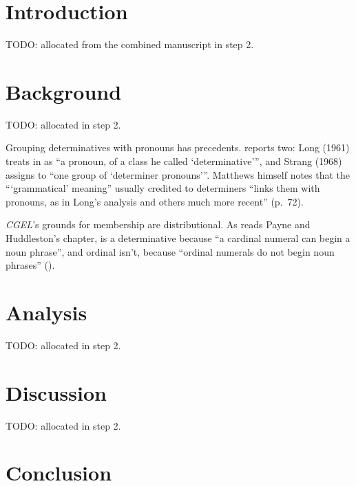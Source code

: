 \documentclass[12pt]{article}
\begin{document}
\section{Introduction}

TODO: allocated from the combined manuscript in step 2.

\section{Background}

TODO: allocated in step 2.

Grouping determinatives with pronouns has precedents. \textcite[71--73]{matthews2014} reports two: Long (1961) treats  in  as \enquote{a pronoun, of a class he called `determinative'}, and Strang (1968) assigns  to \enquote{one group of `determiner pronouns'}. Matthews himself notes that the \enquote{`grammatical' meaning} usually credited to determiners \enquote{links them with pronouns, as in Long's analysis and others much more recent} (p.~72).

\textit{CGEL}'s grounds for membership are distributional. As \textcite[77]{matthews2014} reads Payne and Huddleston's chapter,  is a determinative because \enquote{a cardinal numeral can begin a noun phrase}, and ordinal  isn't, because \enquote{ordinal numerals do not begin noun phrases} ().

\section{Analysis}

TODO: allocated in step 2.

\section{Discussion}

TODO: allocated in step 2.

\section{Conclusion}\label{sec:conclusion}
\end{document}
